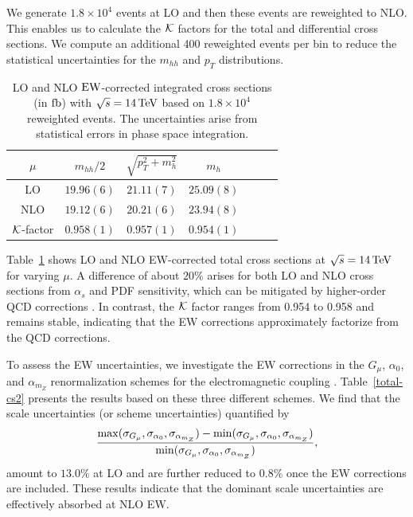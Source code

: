 We generate $1.8\times 10^4$ events at LO and then these events are reweighted to NLO. This enables us to calculate the $\cal{K}$ factors for the total and differential cross sections. We compute an additional 400 reweighted events per bin to reduce the statistical uncertainties for the $m_{hh}$ and $p_T$ distributions.

\begin{table}
\begin{center}
\begin{tabular}{ccccccc}
\toprule
$\mu$  & $m_{hh}/2$  & $\sqrt{p_{T}^2+m_h^2}$ & $m_h$ \\
\midrule
LO   & $19.96(6)$   & $21.11(7)$  & $25.09(8)$ \\
NLO  & $19.12(6)$   & $20.21(6)$  & $23.94(8)$ \\
${\cal K}$-factor  & $0.958(1)$   &     $0.957(1)$   &   $0.954(1)$     \\
\bottomrule
\end{tabular}
\caption{LO and NLO ${\rm EW}$-corrected integrated cross sections (in $\textup{fb}$) with $\sqrt{s}=14\,\textup{TeV}$ based on $1.8\times 10^4$ reweighted events. The uncertainties arise from statistical errors in phase space integration.}
\label{total-cs}
\end{center}
\end{table}

Table~\ref{total-cs} shows LO and NLO EW-corrected total cross sections at $\sqrt{s}=14\,\textup{TeV}$ for varying $\mu$. A difference of about $20\%$ arises for both LO and NLO cross sections from $\alpha_s$ and PDF sensitivity, which can be mitigated by higher-order QCD corrections \cite{Jones:2023uzh}. In contrast, the $\cal{K}$ factor ranges from 0.954 to 0.958 and remains stable, indicating that the EW corrections approximately factorize from the QCD corrections.

To assess the EW uncertainties, we investigate the EW corrections in the $G_{\mu}$, $\alpha_0$, and $\alpha_{m_Z}$ renormalization schemes for the electromagnetic coupling \cite{Denner:2019vbn,Sang:2024vqk}. Table~\ref{total-cs2} presents the results based on these three different schemes. We find that the scale uncertainties (or scheme uncertainties) quantified by
\begin{eqnarray}
\frac{{\rm max}(\sigma_{G_{\mu}},\sigma_{\alpha_0},\sigma_{\alpha_{m_Z}})-
      {\rm min}(\sigma_{G_{\mu}},\sigma_{\alpha_0},\sigma_{\alpha_{m_Z}})}
     {{\rm min}(\sigma_{G_{\mu}},\sigma_{\alpha_0},\sigma_{\alpha_{m_Z}})},
\end{eqnarray}
amount to $13.0\%$ at LO and are further reduced to $0.8\%$ once the EW corrections are included. These results indicate that the dominant scale uncertainties are effectively absorbed at NLO EW.

